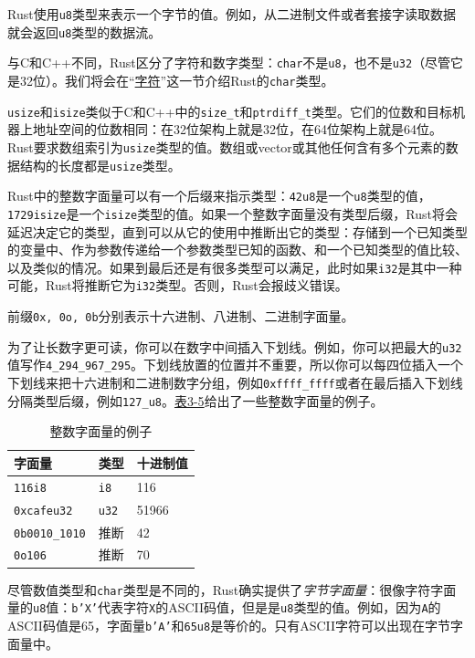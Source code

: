 Rust使用\texttt{u8}类型来表示一个字节的值。例如，从二进制文件或者套接字读取数据就会返回\texttt{u8}类型的数据流。

与C和C++不同，Rust区分了字符和数字类型：\texttt{char}不是\texttt{u8}，也不是\texttt{u32}（尽管它是32位）。我们将会在“\hyperref[char]{字符}”这一节介绍Rust的\texttt{char}类型。

\texttt{usize}和\texttt{isize}类似于C和C++中的\texttt{size\_t}和\texttt{ptrdiff\_t}类型。它们的位数和目标机器上地址空间的位数相同：在32位架构上就是32位，在64位架构上就是64位。Rust要求数组索引为\texttt{usize}类型的值。数组或vector或其他任何含有多个元素的数据结构的长度都是\texttt{usize}类型。

Rust中的整数字面量可以有一个后缀来指示类型：\texttt{42u8}是一个\texttt{u8}类型的值，\texttt{1729isize}是一个\texttt{isize}类型的值。如果一个整数字面量没有类型后缀，Rust将会延迟决定它的类型，直到可以从它的使用中推断出它的类型：存储到一个已知类型的变量中、作为参数传递给一个参数类型已知的函数、和一个已知类型的值比较、以及类似的情况。如果到最后还是有很多类型可以满足，此时如果\texttt{i32}是其中一种可能，Rust将推断它为\texttt{i32}类型。否则，Rust会报歧义错误。

前缀\texttt{0x, 0o, 0b}分别表示十六进制、八进制、二进制字面量。

为了让长数字更可读，你可以在数字中间插入下划线。例如，你可以把最大的\texttt{u32}值写作\texttt{4\_294\_967\_295}。下划线放置的位置并不重要，所以你可以每四位插入一个下划线来把十六进制和二进制数字分组，例如\texttt{0xffff\_ffff}或者在最后插入下划线分隔类型后缀，例如\texttt{127\_u8}。\hyperref[t3-5]{表3-5}给出了一些整数字面量的例子。
\begin{table}[htbp]
    \centering
    \caption{整数字面量的例子}
    \label{t3-5}
    \begin{tabular}{lll}
        \hline
        \textbf{字面量} & \textbf{类型} & \textbf{十进制值} \\
        \hline
        \texttt{116i8}          & \texttt{i8}       &   116 \\
        \rowcolor{tablecolor}
        \texttt{0xcafeu32}      & \texttt{u32}      &   51966 \\
        \texttt{0b0010\_1010}   & 推断              &   42 \\
        \rowcolor{tablecolor}
        \texttt{0o106}          & 推断              &   70 \\
    \end{tabular}
\end{table}

尽管数值类型和\texttt{char}类型是不同的，Rust确实提供了\emph{字节字面量}：很像字符字面量的\texttt{u8}值：\texttt{b'X'}代表字符\texttt{X}的ASCII码值，但是是\texttt{u8}类型的值。例如，因为\texttt{A}的ASCII码值是65，字面量\texttt{b'A'}和\texttt{65u8}是等价的。只有ASCII字符可以出现在字节字面量中。

